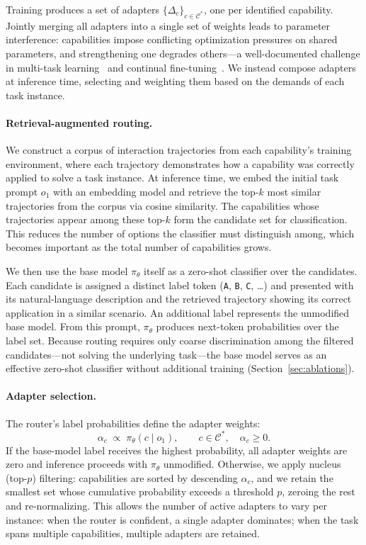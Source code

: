Training produces a set of adapters $\{\Delta_c\}_{c \in \mathcal{C}^*}$, one per identified capability. Jointly merging all adapters into a single set of weights leads to parameter interference: capabilities impose conflicting optimization pressures on shared parameters, and strengthening one degrades others---a well-documented challenge in multi-task learning~\citep{yu2020gradient, fifty2021efficiently} and continual fine-tuning~\citep{kirkpatrick2017overcoming, french1999catastrophic}. We instead compose adapters at inference time, selecting and weighting them based on the demands of each task instance.

\paragraph{Retrieval-augmented routing.}
We construct a corpus of interaction trajectories from each capability's training environment, where each trajectory demonstrates how a capability was correctly applied to solve a task instance. At inference time, we embed the initial task prompt $o_1$ with an embedding model and retrieve the top-$k$ most similar trajectories from the corpus via cosine similarity. The capabilities whose trajectories appear among these top-$k$ form the candidate set for classification. This reduces the number of options the classifier must distinguish among, which becomes important as the total number of capabilities grows.

We then use the base model $\pi_\theta$ itself as a zero-shot classifier over the candidates. Each candidate is assigned a distinct label token (\texttt{A}, \texttt{B}, \texttt{C}, \ldots) and presented with its natural-language description and the retrieved trajectory showing its correct application in a similar scenario. An additional label represents the unmodified base model. From this prompt, $\pi_\theta$ produces next-token probabilities over the label set. Because routing requires only coarse discrimination among the filtered candidates---not solving the underlying task---the base model serves as an effective zero-shot classifier without additional training (Section~\ref{sec:ablations}).

\paragraph{Adapter selection.}
The router's label probabilities define the adapter weights:
\[
\alpha_c \;\propto\; \pi_\theta(c \mid o_1), \qquad c \in \mathcal{C}^*,\quad \alpha_c \geq 0.
\]
If the base-model label receives the highest probability, all adapter weights are zero and inference proceeds with $\pi_\theta$ unmodified. Otherwise, we apply nucleus (top-$p$) filtering: capabilities are sorted by descending $\alpha_c$, and we retain the smallest set whose cumulative probability exceeds a threshold $p$, zeroing the rest and re-normalizing. This allows the number of active adapters to vary per instance: when the router is confident, a single adapter dominates; when the task spans multiple capabilities, multiple adapters are retained.

